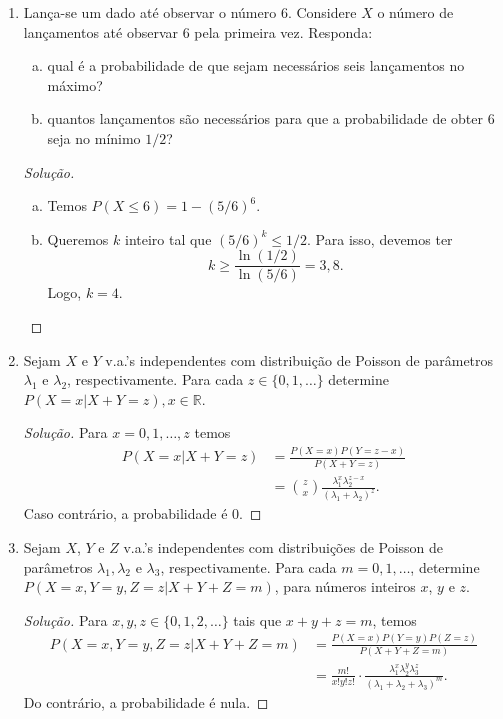 \documentclass[../Notas.tex]{subfiles}
\begin{document}
\begin{enumerate}
    \item Lança-se um dado até observar o número 6. Considere $X$ o número de lançamentos até observar 6 pela primeira vez. Responda:
    \begin{enumerate}[a)]
    \item qual é a probabilidade de que sejam necessários seis lançamentos no máximo?
    \item quantos lançamentos são necessários para que a probabilidade de obter 6 seja no mínimo $1/2$?
    \end{enumerate}
    \begin{proof}[Solução]
        \begin{enumerate}[a)]
            \item Temos $P(X\leq 6) = 1 - (5/6)^6$.
            \item Queremos $k$ inteiro tal que $(5/6)^k \leq 1/2$. Para isso, devemos ter
            \[
            k \geq \frac{\ln(1/2)}{\ln(5/6)} = 3,8.
            \]
            Logo, $k=4$.
        \end{enumerate}
    \end{proof}
    \item Sejam $X$ e $Y$ v.a.'s independentes com distribuição de Poisson de parâmetros $\lambda_1$ e $\lambda_2$, respectivamente. Para cada $z\in\{0,1,\dots\}$ determine $P(X=x|X+Y=z), x\in\mathbb{R}$.
    \begin{proof}[Solução]
        Para $x=0,1,\dots,z$ temos 
        \begin{align*}
            P(X=x|X+Y=z) &= \frac{P(X=x)P(Y=z-x)}{P(X+Y=z)} \\
                         &= \binom{z}{x}\frac{\lambda_1^{x}\lambda_2^{z-x}}{(\lambda_1+\lambda_2)^z}.
        \end{align*}
        Caso contrário, a probabilidade é 0.
    \end{proof}
    \item Sejam $X$, $Y$ e $Z$ v.a.'s independentes com distribuições de Poisson de parâmetros $\lambda_1, \lambda_2$ e $\lambda_3$, respectivamente. Para cada $m=0,1,\dots$, determine 
    $P(X=x, Y=y, Z=z|X+Y+Z=m)$, para números inteiros $x$, $y$ e $z$.
    \begin{proof}[Solução]
        Para $x,y,z\in\{0,1,2,\dots\}$ tais que $x+y+z=m$, temos
        \begin{align*}
            P(X=x, Y=y, Z=z|X+Y+Z=m) &= \frac{P(X=x)P(Y=y)P(Z=z)}{P(X+Y+Z=m)} \\
                                     &= \frac{m!}{x!y!z!}\cdot
                        \frac{\lambda_1^x\lambda_2^y\lambda_3^z}{(\lambda_1+\lambda_2+\lambda_3)^m}.
        \end{align*}
        Do contrário, a probabilidade é nula.
    \end{proof}
\end{enumerate}
\end{document}
